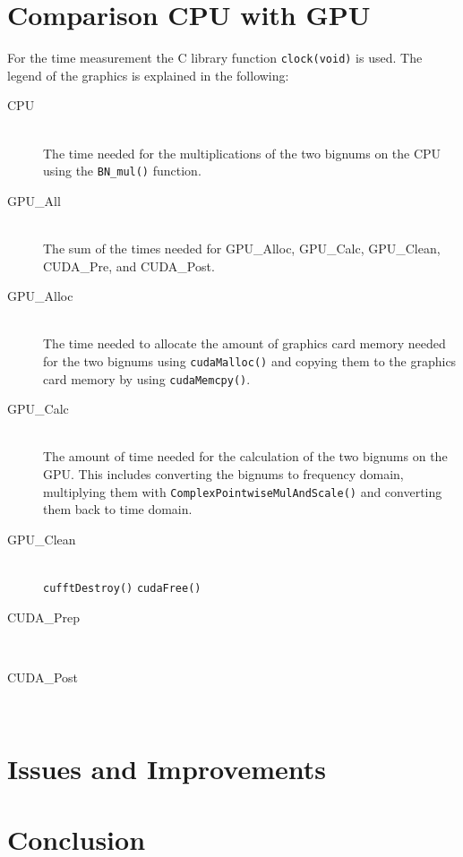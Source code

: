 \documentclass[12pt,a4paper]{article}
\begin{document}
\section{Comparison CPU with GPU}
For the time measurement the C library function \texttt{clock(void)} is used. The legend of the graphics is explained in the following:
\begin{description}
\item[CPU]\hfill \\
The time needed for the multiplications of the two bignums on the CPU using the \texttt{BN_mul()} function.
\item[GPU\_All]\hfill \\ 
The sum of the times needed for GPU\_Alloc, GPU\_Calc, GPU\_Clean, CUDA\_Pre, and CUDA\_Post.
\item[GPU\_Alloc]\hfill \\ 
The time needed to allocate the amount of graphics card memory needed for the two bignums using \texttt{cudaMalloc()} and copying them to the graphics card memory by using \texttt{cudaMemcpy()}.
\item[GPU\_Calc]\hfill \\ 
The amount of time needed for the calculation of the two bignums on the GPU. This includes converting the bignums to frequency domain, multiplying them with \texttt{ComplexPointwiseMulAndScale()} and converting them back to time domain.
\item[GPU\_Clean]\hfill \\ 
\texttt{cufftDestroy()} \texttt{cudaFree()}
\item[CUDA\_Prep]\hfill \\ 
\item[CUDA\_Post]\hfill \\ 
\end{description}




\section{Issues and Improvements}

\section{Conclusion}


\end{document}
